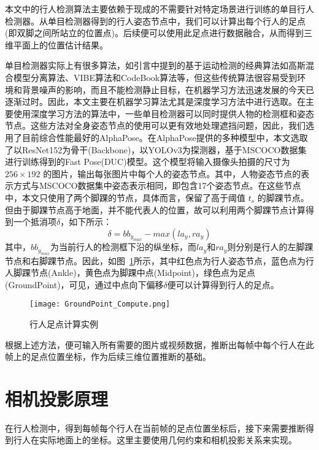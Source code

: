本文中的行人检测算法主要依赖于现成的不需要针对特定场景进行训练的单目行人检测器。从单目检测器得到的行人姿态节点中，我们可以计算出每个行人的足点(即双脚之间所站立的位置点)。后续便可以使用此足点进行数据融合，从而得到三维平面上的位置估计结果。

单目检测器实际上有很多算法，如引言中提到的基于运动检测的经典算法如高斯混合模型分离算法、VIBE算法和CodeBook算法等，但这些传统算法很容易受到环境和背景噪声的影响，而且不能检测静止目标，在机器学习方法迅速发展的今天已逐渐过时。因此，本文主要在机器学习算法尤其是深度学习方法中进行选取。在主要使用深度学习方法的算法中，一些单目检测器可以同时提供人物的检测框和姿态节点\cite{li2019crowdpose}。这些方法对全身姿态节点的使用可以更有效地处理遮挡问题，因此，我们选用了目前综合性能最好的AlphaPose。在AlphaPose提供的多种模型中，本文选取了以ResNet152为骨干(Backbone)，以YOLOv3为探测器，基于MSCOCO数据集\cite{lin2014microsoft}进行训练得到的Fast Pose(DUC)\cite{fang2017rmpe, li2019crowdpose, xiu2018poseflow}模型。这个模型将输入摄像头拍摄的尺寸为 $256 \times 192$ 的图片，输出每张图片中每个人的姿态节点。其中，人物姿态节点的表示方式与MSCOCO数据集\cite{lin2014microsoft}中姿态表示相同，即包含17个姿态节点。在这些节点中，本文只使用了两个脚踝的节点，具体而言，保留了高于阈值 $t_s$ 的脚踝节点。但由于脚踝节点高于地面，并不能代表人的位置，故可以利用两个脚踝节点计算得到一个抵消项$\delta$，如下所示：
\begin{equation}
 \delta = bb_{y_{max}} - max(la_y, ra_y)
\end{equation}
其中，$bb_{y_{max}}$为当前行人的检测框下沿的纵坐标，而$la_y$和$ra_y$则分别是行人的左脚踝节点和右脚踝节点。因此，如图~\ref{GroundPoint_Compute}所示，其中红色点为行人姿态节点，蓝色点为行人脚踝节点(Ankle)，黄色点为脚踝中点(Midpoint)，绿色点为足点(GroundPoint)，可见，通过中点向下偏移$\delta$便可以计算得到行人的足点。
\begin{figure}
    \centering
    \texttt{[image: GroundPoint\_Compute.png]}
    \caption{行人足点计算实例}
    \label{GroundPoint_Compute}
\end{figure}
根据上述方法，便可输入所有需要的图片或视频数据，推断出每帧中每个行人在此帧上的足点位置坐标，作为后续三维位置推断的基础。

\section{相机投影原理}

在行人检测中，得到每帧每个行人在当前帧的足点位置坐标后，接下来需要推断得到行人在实际地面上的坐标。这里主要使用几何约束和相机投影关系来实现。

